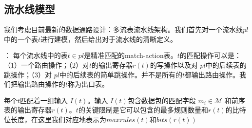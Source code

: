 





\subsection{流水线模型}
\label{subsec:pipeline-model}

我们考虑目前最新的数据通路设计：多流表流水线架构。我们首先对一个流水线$pl$中的一个表$t$进行建模，然后给出对于流水线的清晰定义。


： 每个流水线中的表$t \in pl$是精准匹配的match-action表。$t$的匹配操作可以是：（1）一个路由操作；（2）对$t$的输出寄存器$r(t)$的写操作以及对 $pl$中的后续表的跳操作；（3）对 $pl$中的后续表的简单跳操作。并不是所有的$t$都输出路由操作。我们把输出路由操作的$t$称为出口表。

每个$t$匹配着一组输入 $I(t)$。输入 $I(t)$包含数据包的匹配字段 $m_i \in \mathcal{M}$ 和前序表的输出寄存器$r(t)$。$t$的关键限制是它可以包含的最多规则数量和$r(t)$的比特位长度，在这里我们对应地表示为$maxrules(t)$和$bits(r(t))$ 

